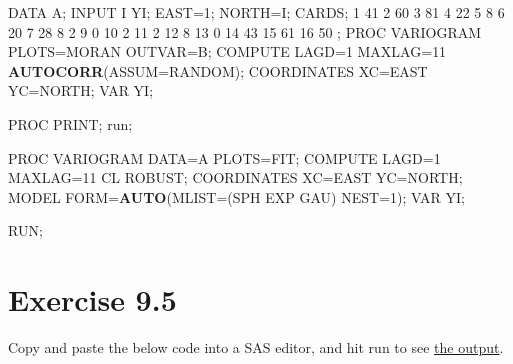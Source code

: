 \documentclass[]{book}
\newenvironment{Shaded}{\begin{snugshade}}{\end{snugshade}}
\newcommand{\DataTypeTok}[1]{\textcolor[rgb]{0.13,0.29,0.53}{#1}}
\newcommand{\DecValTok}[1]{\textcolor[rgb]{0.00,0.00,0.81}{#1}}
\newcommand{\KeywordTok}[1]{\textcolor[rgb]{0.13,0.29,0.53}{\textbf{#1}}}
\newcommand{\NormalTok}[1]{#1}
\begin{document}
\begin{Shaded}
\begin{Highlighting}[]
\NormalTok{DATA A;}
\NormalTok{INPUT I YI;}
\NormalTok{EAST=}\DecValTok{1}\NormalTok{;}
\NormalTok{NORTH=I;}
\NormalTok{CARDS;}
\DecValTok{1}   \DecValTok{41}
\DecValTok{2}   \DecValTok{60}
\DecValTok{3}   \DecValTok{81}
\DecValTok{4}   \DecValTok{22}
\DecValTok{5}   \DecValTok{8}
\DecValTok{6}   \DecValTok{20}
\DecValTok{7}   \DecValTok{28}
\DecValTok{8}   \DecValTok{2}
\DecValTok{9}   \DecValTok{0}
\DecValTok{10}  \DecValTok{2}
\DecValTok{11}  \DecValTok{2}
\DecValTok{12}  \DecValTok{8}
\DecValTok{13}  \DecValTok{0}
\DecValTok{14}  \DecValTok{43}
\DecValTok{15}  \DecValTok{61}
\DecValTok{16}  \DecValTok{50}
\NormalTok{;}
\NormalTok{PROC VARIOGRAM PLOTS=MORAN OUTVAR=B;}
\NormalTok{COMPUTE LAGD=}\DecValTok{1}\NormalTok{ MAXLAG=}\DecValTok{11} \KeywordTok{AUTOCORR}\NormalTok{(}\DataTypeTok{ASSUM=}\NormalTok{RANDOM);}
\NormalTok{COORDINATES XC=EAST YC=NORTH;}
\NormalTok{VAR YI;}

\NormalTok{PROC PRINT;}
\NormalTok{run;}

\NormalTok{PROC VARIOGRAM DATA=A PLOTS=FIT;}
\NormalTok{COMPUTE LAGD=}\DecValTok{1}\NormalTok{ MAXLAG=}\DecValTok{11}\NormalTok{ CL ROBUST;}
\NormalTok{COORDINATES XC=EAST YC=NORTH;}
\NormalTok{MODEL FORM=}\KeywordTok{AUTO}\NormalTok{(}\DataTypeTok{MLIST=}\NormalTok{(SPH EXP GAU) }\DataTypeTok{NEST=}\DecValTok{1}\NormalTok{);}
\NormalTok{VAR YI;}

\NormalTok{RUN;}
\end{Highlighting}
\end{Shaded}

\hypertarget{exercise-9.5}{%
\section{Exercise 9.5}\label{exercise-9.5}}

Copy and paste the below code into a SAS editor, and hit run to see \href{https://github.com/luckymehra/epidem-exercises/blob/master/sas_output/ex9_5.pdf}{the output}.
\end{document}
